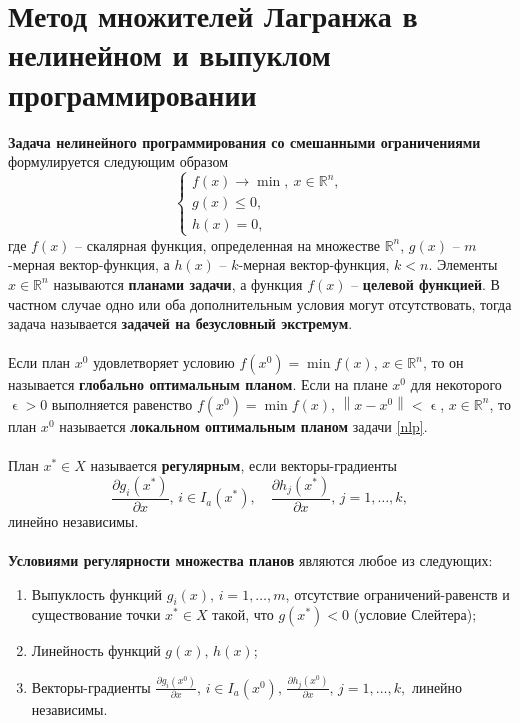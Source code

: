 \documentclass[a4paper, 12pt]{report}
\numberwithin{equation}{section}
\renewcommand{\leq}{\leqslant}
\renewcommand{\epsilon}{\upvarepsilon}
\newcommand\Norm[1]{\left\| #1 \right\|}
\begin{document}
	\section{Метод множителей Лагранжа в нелинейном и выпуклом программировании}
	\textbf{Задача нелинейного программирования со смешанными ограничениями} формулируется следующим образом
	\begin{equation}
		\label{nlp}
		\begin{cases}
			f(x)\to \min,\ x \in \mathbb R^n,\\
			g(x)\leq 0,\\
			h(x) = 0,
		\end{cases}
	\end{equation}
	где $f(x)$ -- скалярная функция, определенная на множестве $\mathbb R^n$, $g(x)$ -- $m$-мерная вектор-функция, а $h(x)$ -- $k$-мерная вектор-функция, $k<n$. Элементы $x\in \mathbb R^n$ называются \textbf{планами задачи}, а функция $f(x)$ -- \textbf{целевой функцией}. В частном случае одно или оба дополнительным условия могут отсутствовать, тогда задача называется \textbf{задачей на безусловный экстремум}.
	\\\\
	Если план $x^0$ удовлетворяет условию $f(x^0) = \min f(x)$, $x \in \mathbb R^n$, то он называется \textbf{глобально оптимальным планом}. Если на плане $x^0$ для некоторого $\epsilon > 0$ выполняется равенство $f(x^0) = \min f(x)$, $\Norm{x - x^0}<\epsilon$, $x \in \mathbb R^n$, то план $x^0$ называется \textbf{локальном оптимальным планом} задачи \eqref{nlp}.
	\\\\
	План \(x^* \in X\) называется \textbf{регулярным}, если векторы-градиенты 
	\[
	\frac{\partial g_i(x^*)}{\partial x}, \, i \in I_a(x^*), \quad \frac{\partial h_j(x^*)}{\partial x}, \, j = 1, \dots, k,
	\]
	линейно независимы.
	\\\\
	\textbf{Условиями регулярности множества планов} являются любое из следующих:
	\begin{enumerate}
		\item Выпуклость функций \(g_i(x), \, i = 1, \dots, m\), отсутствие ограничений-равенств и существование точки \(x^* \in X\) такой, что \(g(x^*) < 0\) (условие Слейтера);
		\item Линейность функций \(g(x), \, h(x)\);
		\item Векторы-градиенты \(\frac{\partial g_i(x^0)}{\partial x}, \, i \in I_a(x^0), \, \frac{\partial h_j(x^0)}{\partial x}, \, j = 1, \dots, k,\) линейно независимы.
	\end{enumerate}
\end{document}
